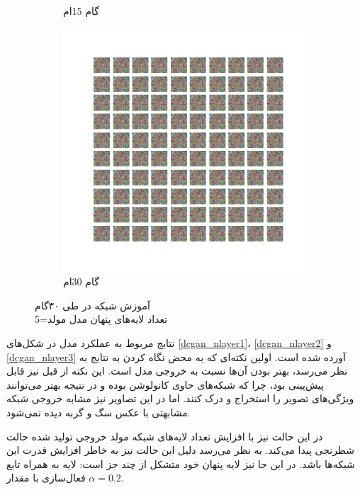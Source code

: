 \documentclass[12pt, a4paper]{book}
\begin{document}
\begin{figure}[h]
\begin{subfigure}{0.3\linewidth}
        \caption{گام 15ام}
    \end{subfigure}
    \begin{subfigure}{0.3\linewidth}
        \includegraphics[width=\linewidth]{images/fcgan/nlayer5/generated_img_20.png}
        \caption{گام 30ام}
    \end{subfigure}
    \caption{آموزش شبکه  در طی ۳۰گام\\ تعداد لایه‌های پنهان مدل مولد=5}
    \label{fcgan_nlayer5}
\end{figure}

نتایج مربوط به عملکرد مدل  در شکل‌های \ref{dcgan_nlayer1}، \ref{dcgan_nlayer2} و \ref{dcgan_nlayer3}
آورده شده است. اولین نکته‌ای که به محض نگاه کردن به نتایج به نظر می‌رسد، بهتر بودن آن‌ها نسبت به
خروجی مدل  است. این نکته از قبل نیز قابل پیش‌پینی بود، چرا که شبکه‌های  حاوی
کانولوشن بوده و در نتیجه بهتر می‌توانند ویژگی‌های تصویر را استخراج و درک کنند. اما در این تصاویر نیز مشابه
خروجی شبکه  مشابهتی با عکس سگ‌ و گربه دیده نمی‌شود.

در این حالت نیز با افزایش تعداد لایه‌های شبکه مولد خروجی تولید شده حالت شطرنجی پیدا می‌کند. به نظر می‌رسد
دلیل این حالت نیز به خاطر افزایش قدرت این شبکه‌ها باشد. در این جا نیز لایه پنهان خود متشکل از چند جز است:
لایه  به همراه تابع فعال‌سازی  با مقدار $\alpha=0.2$.
\end{document}
